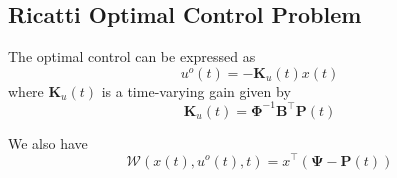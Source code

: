 \documentclass[11pt,draftd]{article}
\begin{document}
\begin{appendices}
	\subsection{Ricatti Optimal Control Problem}
	The optimal control can be expressed as
	\begin{equation}
	u^{o}(t) = -\mathbf{K}_{u}(t)x(t)
	\end{equation}
	where $ \mathbf{K}_{u}(t) $ is a time-varying gain given by
	\begin{equation} 
	\mathbf{K}_{u}(t) = \mathbf{\Phi}^{-1}\mathbf{B}^{\intercal}\mathbf{P}(t)
	\end{equation}
	
	We also have 
	\begin{equation}
	\mathcal{W}(x(t), u^{o}(t), t) = x^{\intercal}\left(	\mathbf{\Psi}-\mathbf{P}(t)		\right)
	\end{equation}
	\newpage
	

	
	
\end{appendices}
\end{document}
